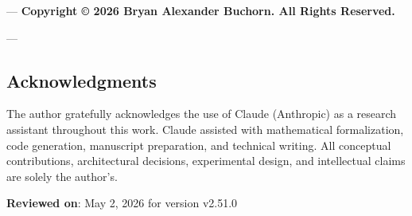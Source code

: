 ---
\textbf{Copyright © 2026 Bryan Alexander Buchorn. All Rights Reserved.}

---
\subsection{Acknow\-ledgments}

The author gratefully ackno\-wledges the use of Claude (Anthropic) as a research assistant throughout this work. Claude assisted with mathe\-matical forma\-lization, code generation, manuscript preparation, and technical writing. All conceptual contr\-ibutions, archi\-tectural decisions, exper\-imental design, and intel\-lectual claims are solely the author's.

\textbf{Reviewed on}: May 2, 2026 for version v2.51.0
